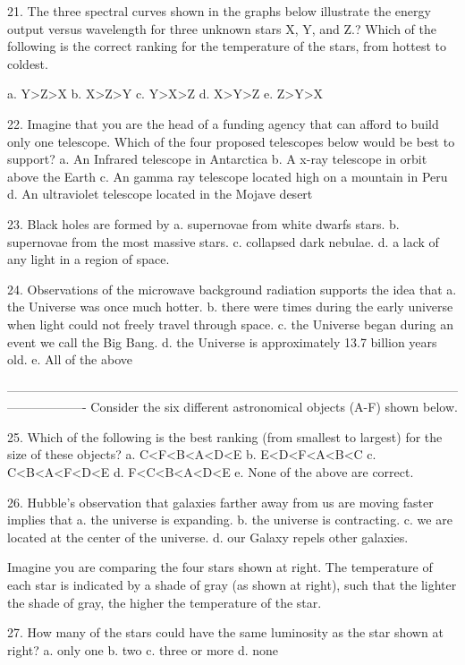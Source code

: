 21. The three spectral curves shown in the graphs below illustrate the energy output versus wavelength for three unknown stars X, Y, and Z.?  Which of the following is the correct ranking for the temperature of the stars, from hottest to coldest.

a. Y>Z>X
b. X>Z>Y
c. Y>X>Z
d. X>Y>Z
e. Z>Y>X



22. Imagine that you are the head of a funding agency that can afford to build only one telescope. Which of the four proposed telescopes below would be best to support?
a. An Infrared telescope in Antarctica
b. A x-ray telescope in orbit above the Earth
c. An gamma ray telescope located high on a mountain in Peru
d. An ultraviolet telescope located in the Mojave desert



23. Black holes are formed by
a. supernovae from white dwarfs stars.
b. supernovae from the most massive stars.
c. collapsed dark nebulae.
d.  a lack of any light in a region of space.



24. Observations of the microwave background radiation supports the idea that
a. the Universe was once much hotter.
b. there were times during the early universe when light could not freely travel through space.
c. the Universe began during an event we call the Big Bang.
d. the Universe is approximately 13.7 billion years old.
e. All of the above


-------------------------------------------------------------------------------------------------------------------------------
Consider the six different astronomical objects (A-F) shown below.


25. Which of the following is the best ranking (from smallest to largest) for the size of these objects?
a. C<F<B<A<D<E
b. E<D<F<A<B<C
c. C<B<A<F<D<E
d. F<C<B<A<D<E
e. None of the above are correct.



26. Hubble’s observation that galaxies farther away from us are moving faster implies that
a. the universe is expanding.
b. the universe is contracting.
c. we are located at the center of the universe.
d. our Galaxy repels other galaxies.


Imagine you are comparing the four stars shown at right.  The temperature of each star is indicated by a shade of gray (as shown at right), such that the lighter the shade of gray, the higher the temperature of the star. 

27. How many of the stars could have the same luminosity as the star shown at right?
a. only one
b. two
c. three or more
d. none 


